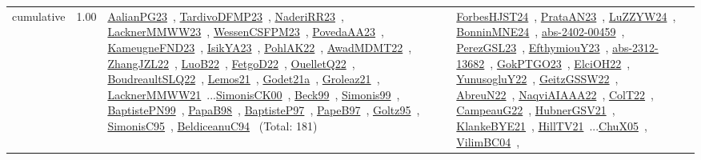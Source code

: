 {\begin{longtable}{p{3cm}r>{\raggedright\arraybackslash}p{6cm}>{\raggedright\arraybackslash}p{6cm}>{\raggedright\arraybackslash}p{8cm}}
\index{cumulative}\index{Constraints!cumulative}cumulative &  1.00 & \href{../works/AalianPG23.pdf}{AalianPG23}~\cite{AalianPG23}, \href{../works/TardivoDFMP23.pdf}{TardivoDFMP23}~\cite{TardivoDFMP23}, \href{../works/NaderiRR23.pdf}{NaderiRR23}~\cite{NaderiRR23}, \href{../works/LacknerMMWW23.pdf}{LacknerMMWW23}~\cite{LacknerMMWW23}, \href{../works/WessenCSFPM23.pdf}{WessenCSFPM23}~\cite{WessenCSFPM23}, \href{../works/PovedaAA23.pdf}{PovedaAA23}~\cite{PovedaAA23}, \href{../works/KameugneFND23.pdf}{KameugneFND23}~\cite{KameugneFND23}, \href{../works/IsikYA23.pdf}{IsikYA23}~\cite{IsikYA23}, \href{../works/PohlAK22.pdf}{PohlAK22}~\cite{PohlAK22}, \href{../works/AwadMDMT22.pdf}{AwadMDMT22}~\cite{AwadMDMT22}, \href{../works/ZhangJZL22.pdf}{ZhangJZL22}~\cite{ZhangJZL22}, \href{../works/LuoB22.pdf}{LuoB22}~\cite{LuoB22}, \href{../works/FetgoD22.pdf}{FetgoD22}~\cite{FetgoD22}, \href{../works/OuelletQ22.pdf}{OuelletQ22}~\cite{OuelletQ22}, \href{../works/BoudreaultSLQ22.pdf}{BoudreaultSLQ22}~\cite{BoudreaultSLQ22}, \href{../works/Lemos21.pdf}{Lemos21}~\cite{Lemos21}, \href{../works/Godet21a.pdf}{Godet21a}~\cite{Godet21a}, \href{../works/Groleaz21.pdf}{Groleaz21}~\cite{Groleaz21}, \href{../works/LacknerMMWW21.pdf}{LacknerMMWW21}~\cite{LacknerMMWW21}...\href{../works/SimonisCK00.pdf}{SimonisCK00}~\cite{SimonisCK00}, \href{../works/Beck99.pdf}{Beck99}~\cite{Beck99}, \href{../works/Simonis99.pdf}{Simonis99}~\cite{Simonis99}, \href{../works/BaptistePN99.pdf}{BaptistePN99}~\cite{BaptistePN99}, \href{../works/PapaB98.pdf}{PapaB98}~\cite{PapaB98}, \href{../works/BaptisteP97.pdf}{BaptisteP97}~\cite{BaptisteP97}, \href{../works/PapeB97.pdf}{PapeB97}~\cite{PapeB97}, \href{../works/Goltz95.pdf}{Goltz95}~\cite{Goltz95}, \href{../works/SimonisC95.pdf}{SimonisC95}~\cite{SimonisC95}, \href{../works/BeldiceanuC94.pdf}{BeldiceanuC94}~\cite{BeldiceanuC94} (Total: 181) & \href{../works/ForbesHJST24.pdf}{ForbesHJST24}~\cite{ForbesHJST24}, \href{../works/PrataAN23.pdf}{PrataAN23}~\cite{PrataAN23}, \href{../works/LuZZYW24.pdf}{LuZZYW24}~\cite{LuZZYW24}, \href{../works/BonninMNE24.pdf}{BonninMNE24}~\cite{BonninMNE24}, \href{../works/abs-2402-00459.pdf}{abs-2402-00459}~\cite{abs-2402-00459}, \href{../works/PerezGSL23.pdf}{PerezGSL23}~\cite{PerezGSL23}, \href{../works/EfthymiouY23.pdf}{EfthymiouY23}~\cite{EfthymiouY23}, \href{../works/abs-2312-13682.pdf}{abs-2312-13682}~\cite{abs-2312-13682}, \href{../works/GokPTGO23.pdf}{GokPTGO23}~\cite{GokPTGO23}, \href{../works/ElciOH22.pdf}{ElciOH22}~\cite{ElciOH22}, \href{../works/YunusogluY22.pdf}{YunusogluY22}~\cite{YunusogluY22}, \href{../works/GeitzGSSW22.pdf}{GeitzGSSW22}~\cite{GeitzGSSW22}, \href{../works/AbreuN22.pdf}{AbreuN22}~\cite{AbreuN22}, \href{../works/NaqviAIAAA22.pdf}{NaqviAIAAA22}~\cite{NaqviAIAAA22}, \href{../works/ColT22.pdf}{ColT22}~\cite{ColT22}, \href{../works/CampeauG22.pdf}{CampeauG22}~\cite{CampeauG22}, \href{../works/HubnerGSV21.pdf}{HubnerGSV21}~\cite{HubnerGSV21}, \href{../works/KlankeBYE21.pdf}{KlankeBYE21}~\cite{KlankeBYE21}, \href{../works/HillTV21.pdf}{HillTV21}~\cite{HillTV21}...\href{../works/ChuX05.pdf}{ChuX05}~\cite{ChuX05}, \href{../works/VilimBC04.pdf}{VilimBC04}~\cite{VilimBC04}, 
\end{longtable}}
